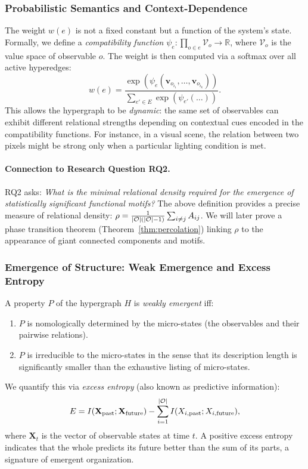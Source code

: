 \subsubsection{Probabilistic Semantics and Context-Dependence}
The weight $w(e)$ is not a fixed constant but a function of the system's state. Formally, we define a \emph{compatibility function} $\psi_e: \prod_{o \in e} \mathcal{V}_o \to \mathbb{R}$, where $\mathcal{V}_o$ is the value space of observable $o$. The weight is then computed via a softmax over all active hyperedges:
\[
w(e) = \frac{\exp(\psi_e(\mathbf{v}_{o_{i_1}}, \dots, \mathbf{v}_{o_{i_k}}))}{\sum_{e' \in E} \exp(\psi_{e'}(\dots))}.
\]
This allows the hypergraph to be \emph{dynamic}: the same set of observables can exhibit different relational strengths depending on contextual cues encoded in the compatibility functions. For instance, in a visual scene, the relation between two pixels might be strong only when a particular lighting condition is met.

\paragraph{Connection to Research Question RQ2.}
RQ2 asks: \emph{What is the minimal relational density required for the emergence of statistically significant functional motifs?} The above definition provides a precise measure of relational density: $\rho = \frac{1}{|\mathcal{O}|(|\mathcal{O}|-1)} \sum_{i \neq j} A_{ij}$. We will later prove a phase transition theorem (Theorem~\ref{thm:percolation}) linking $\rho$ to the appearance of giant connected components and motifs.

\subsubsection{Emergence of Structure: Weak Emergence and Excess Entropy}
\begin{definition}
A property $P$ of the hypergraph $H$ is \emph{weakly emergent} iff:
\begin{enumerate}
    \item $P$ is nomologically determined by the micro-states (the observables and their pairwise relations).
    \item $P$ is irreducible to the micro-states in the sense that its description length is significantly smaller than the exhaustive listing of micro-states.
\end{enumerate}
\end{definition}
We quantify this via \emph{excess entropy} (also known as predictive information):
\[
E = I(\mathbf{X}_{\text{past}}; \mathbf{X}_{\text{future}}) - \sum_{i=1}^{|\mathcal{O}|} I(X_{i,\text{past}}; X_{i,\text{future}}),
\]
where $\mathbf{X}_t$ is the vector of observable states at time $t$. A positive excess entropy indicates that the whole predicts its future better than the sum of its parts, a signature of emergent organization.

